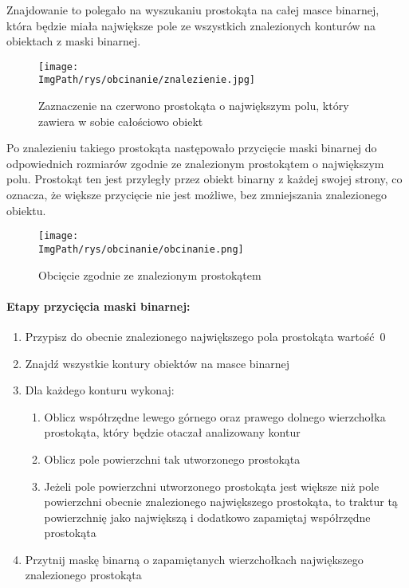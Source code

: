 \documentclass[a4paper,12pt,twoside,openany]{report}
\newcommand{\ImgPath}{.}
\begin{document}
Znajdowanie to polegało na wyszukaniu prostokąta na całej masce binarnej, która będzie miała największe pole ze wszystkich znalezionych konturów na obiektach z maski binarnej. 

\begin{figure}[H]
	\centering
	{\label{fig:a}\texttt{[image: \\ImgPath/rys/obcinanie/znalezienie.jpg]}}
	\caption{Zaznaczenie na czerwono prostokąta o największym polu, który zawiera w sobie całościowo obiekt}
\end{figure}

Po znalezieniu takiego prostokąta następowało przycięcie maski binarnej do odpowiednich rozmiarów zgodnie ze znalezionym prostokątem o największym polu. Prostokąt ten jest przyległy przez obiekt binarny z każdej swojej strony, co oznacza, że większe przycięcie nie jest możliwe, bez zmniejszania znalezionego obiektu.

\begin{figure}[H]
	\centering
	{\label{fig:b}\texttt{[image: \\ImgPath/rys/obcinanie/obcinanie.png]}}
	\caption{Obcięcie zgodnie ze znalezionym prostokątem}
\end{figure}
\paragraph{Etapy przycięcia maski binarnej:}
\begin{enumerate}
	\item Przypisz do obecnie znalezionego największego pola prostokąta wartość~0
	\item Znajdź wszystkie kontury obiektów na masce binarnej
	\item Dla każdego konturu wykonaj:
	\begin{enumerate}
		\item Oblicz współrzędne lewego górnego oraz prawego dolnego wierzchołka prostokąta, który będzie otaczał analizowany kontur 
		\item Oblicz pole powierzchni tak utworzonego prostokąta
		\item Jeżeli pole powierzchni utworzonego prostokąta jest większe niż pole powierzchni obecnie znalezionego największego prostokąta, to traktur tą powierzchnię jako największą i dodatkowo zapamiętaj współrzędne prostokąta
	\end{enumerate}
	\item Przytnij maskę binarną o zapamiętanych wierzchołkach największego znalezionego prostokąta
\end{enumerate}
\end{document}
